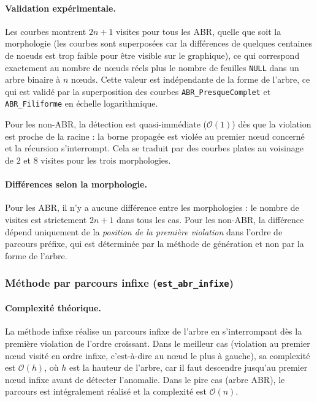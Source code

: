 \documentclass[12pt, a4paper]{article}
\begin{document}
\paragraph{Validation expérimentale.}

Les courbes montrent $2n + 1$ visites pour tous les ABR, quelle que soit la morphologie (les courbes sont superposées car la différences de quelques centaines de noeuds est trop faible pour être visible sur le graphique), 
ce qui correspond exactement au nombre de nœuds réels plus le nombre de feuilles \texttt{NULL}
dans un arbre binaire à $n$ nœuds. Cette valeur est indépendante de la forme de l'arbre,
ce qui est validé par la superposition des courbes \texttt{ABR\_PresqueComplet} et
\texttt{ABR\_Filiforme} en échelle logarithmique.

Pour les non-ABR, la détection est quasi-immédiate ($\mathcal{O}(1)$) dès que la
violation est proche de la racine : la borne propagée est violée au premier nœud
concerné et la récursion s'interrompt. Cela se traduit par des courbes plates
au voisinage de $2$ et $8$ visites pour les trois morphologies.
\paragraph{Différences selon la morphologie.}

Pour les ABR, il n'y a aucune différence entre les morphologies : le nombre de
visites est strictement $2n+1$ dans tous les cas. Pour les non-ABR, la différence
dépend uniquement de la \emph{position de la première violation} dans l'ordre de
parcours préfixe, qui est déterminée par la méthode de génération et non par la
forme de l'arbre.


\subsubsection{Méthode par parcours infixe (\texttt{est\_abr\_infixe})}

\paragraph{Complexité théorique.}

La méthode infixe réalise un parcours infixe de l'arbre en s'interrompant dès la
première violation de l'ordre croissant. Dans le meilleur cas (violation au premier
nœud visité en ordre infixe, c'est-à-dire au nœud le plus à gauche), sa complexité
est $\mathcal{O}(h)$, où $h$ est la hauteur de l'arbre, car il faut descendre jusqu'au
premier nœud infixe avant de détecter l'anomalie. Dans le pire cas (arbre ABR),
le parcours est intégralement réalisé et la complexité est $\mathcal{O}(n)$.
\end{document}
